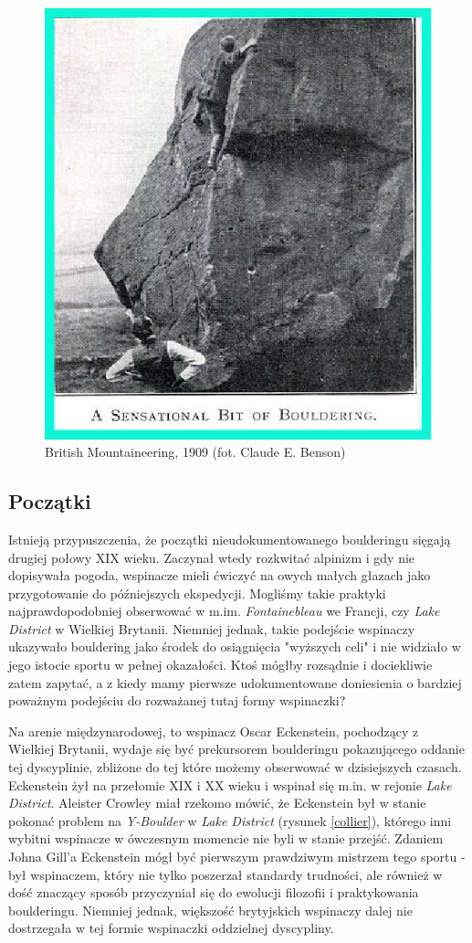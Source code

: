 \documentclass{article}
\begin{document}
\begin{figure}[!htbp]
	\begin{center}
		\includegraphics[width=0.7\linewidth]{images/old1.eps}
	\end{center}
	\caption{British Mountaineering, 1909 (fot. Claude E. Benson) \cite{gill-history}}
	\label{benson}
\end{figure}

\subsection{Początki}
Istnieją przypuszczenia, że początki nieudokumentowanego boulderingu sięgają drugiej połowy XIX wieku. Zaczynał wtedy rozkwitać alpinizm i gdy nie dopisywała pogoda, wspinacze mieli ćwiczyć na owych małych głazach jako przygotowanie do późniejszych ekspedycji. Mogliśmy takie praktyki najprawdopodobniej obserwować w m.im. \textit{Fontainebleau} we Francji, czy \textit{Lake District} w Wielkiej Brytanii. Niemniej jednak, takie podejście wspinaczy ukazywało bouldering jako środek do osiągnięcia "wyższych celi" i nie widziało w jego istocie sportu w pełnej okazałości. Ktoś mógłby rozsądnie i dociekliwie zatem zapytać, a z kiedy mamy pierwsze udokumentowane doniesienia o bardziej poważnym podejściu do rozważanej tutaj formy wspinaczki?

Na arenie międzynarodowej, to wspinacz Oscar Eckenstein, pochodzący z Wielkiej Brytanii, wydaje się być prekursorem boulderingu pokazującego oddanie tej dyscyplinie, zbliżone do tej które możemy obserwować w dzisiejszych czasach. Eckenstein żył na przełomie XIX i XX wieku i wspinał się m.in. w rejonie \textit{Lake District}. Aleister Crowley miał rzekomo mówić, że Eckenstein był w stanie pokonać problem na \textit{Y-Boulder} w \textit{Lake District} (rysunek \ref{collier}), którego inni wybitni wspinacze w ówczesnym momencie nie byli w stanie przejść. Zdaniem Johna Gill'a Eckenstein mógł być pierwszym prawdziwym mistrzem tego sportu - był wspinaczem, który nie tylko poszerzał standardy trudności, ale również w dość znaczący sposób przyczyniał się do ewolucji filozofii i praktykowania boulderingu. Niemniej jednak, większość brytyjskich wspinaczy dalej nie dostrzegała w tej formie wspinaczki oddzielnej dyscypliny.
\end{document}
